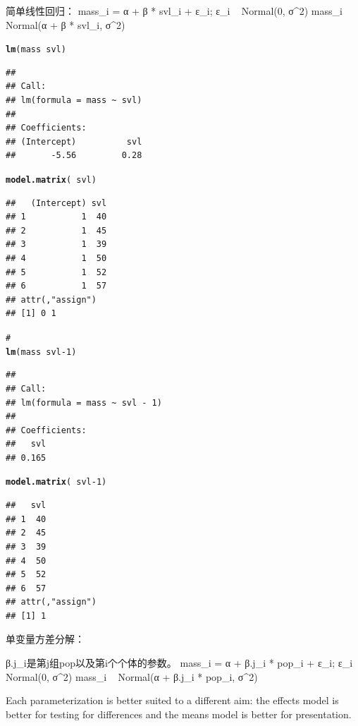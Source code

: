 \documentclass{article}\usepackage[]{graphicx}\usepackage[]{color}
\makeatletter
\newcommand{\hlnum}[1]{\textcolor[rgb]{0.686,0.059,0.569}{#1}}%
\newcommand{\hlcom}[1]{\textcolor[rgb]{0.678,0.584,0.686}{\textit{#1}}}%
\newcommand{\hlopt}[1]{\textcolor[rgb]{0,0,0}{#1}}%
\newcommand{\hlstd}[1]{\textcolor[rgb]{0.345,0.345,0.345}{#1}}%
\newcommand{\hlkwd}[1]{\textcolor[rgb]{0.737,0.353,0.396}{\textbf{#1}}}%
\newenvironment{kframe}{%
 \def\at@end@of@kframe{}%
 \ifinner\ifhmode%
  \def\at@end@of@kframe{\end{minipage}}%
  \begin{minipage}{\columnwidth}%
 \fi\fi%
 \def\FrameCommand##1{\hskip\@totalleftmargin \hskip-\fboxsep
 \colorbox{shadecolor}{##1}\hskip-\fboxsep
     \hskip-\linewidth \hskip-\@totalleftmargin \hskip\columnwidth}%
 \MakeFramed {\advance\hsize-\width
   \@totalleftmargin\z@ \linewidth\hsize
   \@setminipage}}%
 {\par\unskip\endMakeFramed%
 \at@end@of@kframe}
\newenvironment{knitrout}{}{} %
\makeatother
\begin{document}
简单线性回归：
 mass_i = α + β * svl_i + ε_i; ε_i ~ Normal(0, σ^2)
 mass_i ~ Normal(α + β * svl_i, σ^2)
\begin{knitrout}
\color{fgcolor}\begin{kframe}
\begin{alltt}
\hlkwd{lm}\hlstd{(mass} \hlopt{~} \hlstd{svl)}
\end{alltt}
\begin{verbatim}
## 
## Call:
## lm(formula = mass ~ svl)
## 
## Coefficients:
## (Intercept)          svl  
##       -5.56         0.28
\end{verbatim}
\begin{alltt}
\hlkwd{model.matrix}\hlstd{(}\hlopt{~}\hlstd{svl)}
\end{alltt}
\begin{verbatim}
##   (Intercept) svl
## 1           1  40
## 2           1  45
## 3           1  39
## 4           1  50
## 5           1  52
## 6           1  57
## attr(,"assign")
## [1] 0 1
\end{verbatim}
\begin{alltt}
\hlcom{# }
\hlkwd{lm}\hlstd{(mass} \hlopt{~} \hlstd{svl} \hlopt{-} \hlnum{1}\hlstd{)}
\end{alltt}
\begin{verbatim}
## 
## Call:
## lm(formula = mass ~ svl - 1)
## 
## Coefficients:
##   svl  
## 0.165
\end{verbatim}
\begin{alltt}
\hlkwd{model.matrix}\hlstd{(}\hlopt{~}\hlstd{svl} \hlopt{-} \hlnum{1}\hlstd{)}
\end{alltt}
\begin{verbatim}
##   svl
## 1  40
## 2  45
## 3  39
## 4  50
## 5  52
## 6  57
## attr(,"assign")
## [1] 1
\end{verbatim}
\end{kframe}
\end{knitrout}


单变量方差分解：

 β.j_i是第j组pop以及第i个个体的参数。
 mass_i = α + β.j_i * pop_i + ε_i; ε_i ~ Normal(0, σ^2)
 mass_i ~ Normal(α + β.j_i * pop_i, σ^2)
 
 Each parameterization is better suited to a different aim: the effects
model is better for testing for differences and the means model is better
for presentation.
\end{document}
